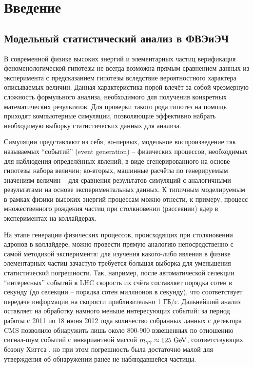 \section{Введение}
\subsection{Модельный статистический анализ в ФВЭиЭЧ}
В современной физике высоких энергий и элементарных частиц верификация феноменологической гипотезы не всегда возможна прямым сравнением данных из эксперимента с предсказанием гипотезы вследствие вероятностного характера описываемых величин. 
Данная характеристика порой влечёт за собой чрезмерную сложность формульного анализа, необходимого для получения конкретных математических результатов. 
Для проверки такого рода гипотез на помощь приходят компьютерные симуляции, позволяющие эффективно набрать необходимую выборку статистических данных для анализа.

Симуляции представляют из себя, во-первых, модельное воспроизведение так называемых ``событий'' (event generation) -- физических процессов, необходимых для наблюдения определённых явлений, в виде сгенерированного на основе гипотезы набора величин; во-вторых, машинные расчёты по генерируемым значениям величин -- для сравнения результатов симуляций с аналогичными результатами на основе экспериментальных данных\cite{EventGeneration}. 
К типичным моделируемым в рамках физики высоких энергий процессам можно отнести, к примеру, процесс множественного рождения частиц при столкновении (рассеянии) ядер в экспериментах на коллайдерах.

На этапе генерации физических процессов, происходящих при столкновении адронов в коллайдере, можно провести прямую аналогию непосредственно с самой методикой эксперимента: для изучения какого-либо явления в физике элементарных частиц зачастую требуется большая выборка для уменьшения статистической погрешности. 
Так, например, после автоматической селекции ``интересных'' событий в LHC скорость их счёта составляет порядка сотен в секунду (до селекции -- порядка сотен миллионов в секунду), что соответствует передаче информации на скорости приблизительно 1 ГБ/с. 
Дальнейший анализ оставляет на обработку намного меньше интересующих событий: за период работы с 2011 по 18 июня 2012 года количество собранных данных с детектора CMS позволило обнаружить лишь около 800-900 взвешенных по отношению сигнал-шум событий с инвариантной массой $m_{\gamma \gamma} \approx 125 \textnormal{ GeV}$, соответствующих бозону Хиггса \cite{HiggsSt}, но при этом погрешность была достаточно малой для утверждения об обнаружении ранее не наблюдавшейся частицы.
